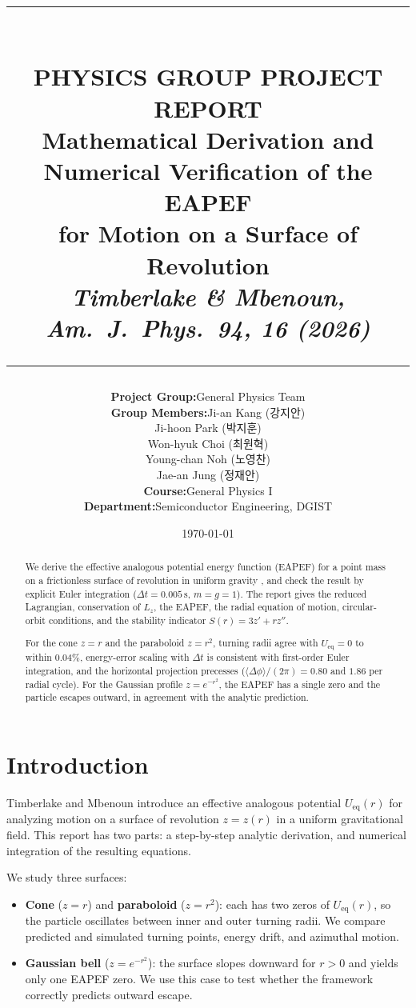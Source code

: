 \documentclass[11pt,letterpaper]{article}
\title{
    \vspace{-1.5in}
    \rule{\linewidth}{1.5pt} \\ \vspace{4mm}
    \large\textbf{PHYSICS GROUP PROJECT REPORT} \\ \vspace{2mm}
    \Large\textbf{Mathematical Derivation and Numerical Verification of the EAPEF \\ for Motion on a Surface of Revolution} \\ \vspace{2mm}
    \large\textit{Timberlake \& Mbenoun, Am.\ J.\ Phys.\ \textbf{94}, 16 (2026)} \\
    \rule{\linewidth}{1.5pt}
}
\author{
    \begin{tabular}{r @{\quad} l}
        \textbf{Project Group:} & General Physics Team \\[1ex]
        \textbf{Group Members:} & \hspace{1.5em}Ji-an Kang (강지안) \\[0.4ex]
                                & \hspace{1.5em}Ji-hoon Park (박지훈) \\[0.4ex]
                                & \hspace{1.5em}Won-hyuk Choi (최원혁) \\[0.4ex]
                                & \hspace{1.5em}Young-chan Noh (노영찬) \\[0.4ex]
                                & \hspace{1.5em}Jae-an Jung (정재안) \\[1ex]
        \textbf{Course:} & General Physics I \\
        \textbf{Department:} & Semiconductor Engineering, DGIST
    \end{tabular}
}
\date{\today}
\begin{document}
\maketitle

\begin{abstract}
We derive the effective analogous potential energy function (EAPEF) for a point mass on a frictionless surface of revolution in uniform gravity \cite{ajp2026}, and check the result by explicit Euler integration ($\Delta t=0.005\,\mathrm{s}$, $m=g=1$). The report gives the reduced Lagrangian, conservation of $L_z$, the EAPEF, the radial equation of motion, circular-orbit conditions, and the stability indicator $S(r)=3z'+rz''$.

For the cone $z=r$ and the paraboloid $z=r^2$, turning radii agree with $U_{\mathrm{eq}}=0$ to within $0.04\%$, energy-error scaling with $\Delta t$ is consistent with first-order Euler integration, and the horizontal projection precesses ($\langle\Delta\phi\rangle/(2\pi)=0.80$ and $1.86$ per radial cycle). For the Gaussian profile $z=e^{-r^2}$, the EAPEF has a single zero and the particle escapes outward, in agreement with the analytic prediction.
\end{abstract}

\setcounter{tocdepth}{2}
\tableofcontents
\newpage

\section{Introduction}

Timberlake and Mbenoun \cite{ajp2026} introduce an effective analogous potential $U_{\mathrm{eq}}(r)$ for analyzing motion on a surface of revolution $z=z(r)$ in a uniform gravitational field. This report has two parts: a step-by-step analytic derivation, and numerical integration of the resulting equations.

We study three surfaces:
\begin{itemize}[leftmargin=1.6em, itemsep=0.35em, topsep=0.4em]
    \item \textbf{Cone} ($z=r$) and \textbf{paraboloid} ($z=r^2$): each has two zeros of $U_{\mathrm{eq}}(r)$, so the particle oscillates between inner and outer turning radii. We compare predicted and simulated turning points, energy drift, and azimuthal motion.
    \item \textbf{Gaussian bell} ($z=e^{-r^2}$): the surface slopes downward for $r>0$ and yields only one EAPEF zero. We use this case to test whether the framework correctly predicts outward escape.
\end{itemize}
\end{document}
